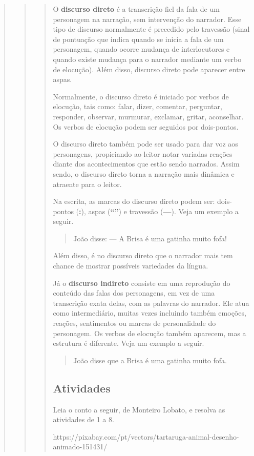 \begin{quote}
\begin{quote}
\begin{quote}
O \textbf{discurso direto} é a transcrição fiel da fala de um personagem na
narração, sem intervenção do narrador. Esse tipo de
discurso normalmente é precedido pelo travessão (sinal de pontuação que
indica quando se inicia a fala de um personagem, quando ocorre mudança
de interlocutores e quando existe mudança para o narrador mediante um
verbo de elocução). Além disso, discurso direto pode aparecer entre aspas.

Normalmente, o discurso direto é iniciado por verbos de elocução, tais como: falar,
dizer, comentar, perguntar, responder, observar, murmurar, exclamar,
gritar, aconselhar. Os verbos de elocução podem ser seguidos por dois-pontos.

O discurso direto também pode ser usado para dar voz aos personagens,
propiciando ao leitor notar variadas reações diante dos acontecimentos
que estão sendo narrados. Assim sendo, o discurso direto torna a
narração mais dinâmica e atraente para o leitor.

Na escrita, as marcas do discurso direto podem ser: dois-pontos (\textbf{:}),
aspas (\textbf{``''}) e travessão (\textbf{---}). Veja um exemplo a seguir.

\begin{quote}
João disse:
--- A Brisa é uma gatinha muito fofa!
\end{quote}

Além disso, é no discurso direto que o narrador mais tem chance de mostrar
possíveis variedades da língua.

Já o \textbf{discurso indireto} consiste em uma reprodução do conteúdo das falas dos
personagens, em vez de uma transcrição exata delas, com as palavras do
narrador. Ele atua como intermediário, muitas vezes incluindo também
emoções, reações, sentimentos ou marcas de personalidade do personagem.
Os verbos de elocução também aparecem, mas a estrutura é diferente.
Veja um exemplo a seguir.

\begin{quote}
João disse que a Brisa é uma gatinha muito fofa.
\end{quote}


\subsection{Atividades}\label{atividades-5}

Leia o conto a seguir, de Monteiro Lobato, e resolva as atividades de 1 a 8.

https://pixabay.com/pt/vectors/tartaruga-animal-desenho-animado-151431/



\end{quote}
\end{quote}
\end{quote}
